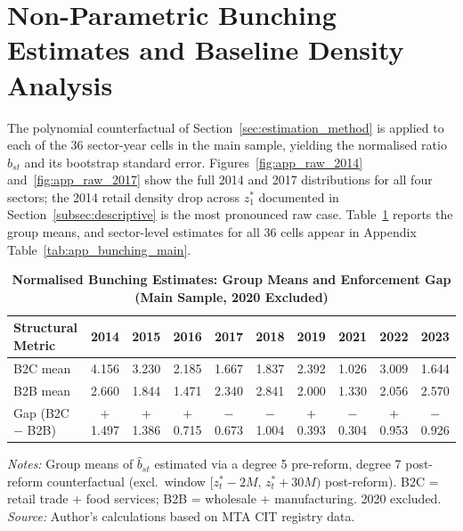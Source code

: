 \documentclass[12pt,oneside,a4paper]{report}
\begin{document}
\section{Non-Parametric Bunching Estimates and Baseline
         Density Analysis}
\label{sec:bunching}

The polynomial counterfactual of Section~\ref{sec:estimation_method} is applied to each of the 36 sector-year cells in the main sample, yielding the normalised ratio $\hat{b}_{st}$ and its bootstrap standard error. Figures~\ref{fig:app_raw_2014} and~\ref{fig:app_raw_2017} show the full 2014 and 2017 distributions for all four sectors; the 2014 retail density drop across $z_1^*$ documented in Section~\ref{subsec:descriptive} is the most pronounced raw case. Table~\ref{tab:bunching} reports the group means, and sector-level estimates for all 36 cells appear in Appendix Table~\ref{tab:app_bunching_main}.

\begin{table}[H]
\centering
\caption{\textbf{Normalised Bunching Estimates: Group Means and
         Enforcement Gap (Main Sample, 2020 Excluded)}}
\label{tab:bunching}
\begin{threeparttable}
\setlength{\tabcolsep}{0pt}
\small
\begin{tabular*}{\linewidth}{l@{\extracolsep{\fill}}ccccccccc}
\toprule
Structural Metric & 2014 & 2015 & 2016 & 2017 & 2018 & 2019 & 2021 & 2022 & 2023 \\
\midrule
B2C mean & 4.156 & 3.230 & 2.185 & 1.667 & 1.837 & 2.392 & 1.026 & 3.009 & 1.644 \\
B2B mean & 2.660 & 1.844 & 1.471 & 2.340 & 2.841 & 2.000 & 1.330 & 2.056 & 2.570 \\
\midrule
Gap (B2C $-$ B2B) & $+$1.497 & $+$1.386 & $+$0.715 & $-$0.673 & $-$1.004 & $+$0.393 & $-$0.304 & $+$0.953 & $-$0.926 \\
\bottomrule
\end{tabular*}
\begin{tablenotes}\footnotesize
\item \textit{Notes:} Group means of $\hat{b}_{st}$ estimated via a degree 5 pre-reform, degree 7 post-reform counterfactual (excl.\ window $[z^*_t - 2M,\, z^*_t + 30M)$ post-reform). B2C = retail trade + food services; B2B = wholesale + manufacturing. 2020 excluded. \textit{Source:} Author's calculations based on MTA CIT registry data.
\end{tablenotes}
\end{threeparttable}
\end{table}
\end{document}
